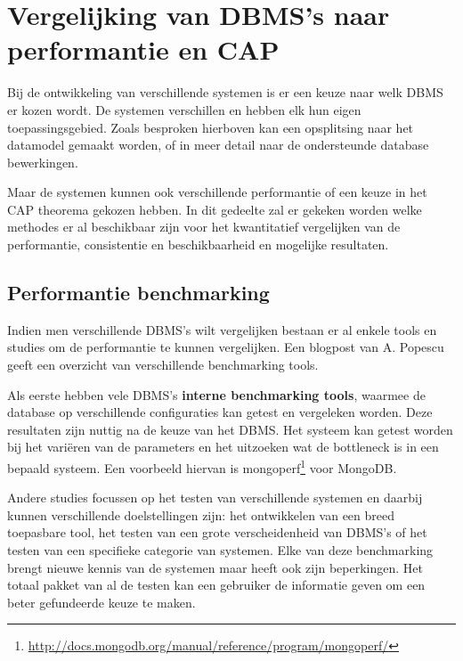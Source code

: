 \section{Vergelijking van DBMS's naar performantie en CAP}
Bij de ontwikkeling van verschillende systemen is er een keuze naar welk DBMS er kozen wordt. De systemen verschillen en hebben elk hun eigen toepassingsgebied. Zoals besproken hierboven kan een opsplitsing naar het datamodel gemaakt worden, of in meer detail naar de ondersteunde database bewerkingen. 

Maar de systemen kunnen ook verschillende performantie of een keuze in het CAP theorema gekozen hebben.  In dit gedeelte zal er gekeken worden welke methodes er al beschikbaar zijn voor het kwantitatief vergelijken van de performantie, consistentie en beschikbaarheid en mogelijke resultaten. 

\subsection{Performantie benchmarking}
Indien men verschillende DBMS's wilt vergelijken bestaan er al enkele tools en studies om de performantie te kunnen vergelijken. Een blogpost van A. Popescu \cite{PopescuBenchmarkOverview} geeft een overzicht van verschillende benchmarking tools. 

Als eerste hebben vele DBMS's \textbf{interne benchmarking tools}, waarmee de database op verschillende configuraties kan getest en vergeleken worden. Deze resultaten zijn nuttig na de keuze van het DBMS. Het systeem kan getest worden bij het variëren van de parameters en het uitzoeken wat de bottleneck is in een bepaald systeem. Een voorbeeld hiervan is mongoperf\footnote{\url{http://docs.mongodb.org/manual/reference/program/mongoperf/}} voor MongoDB. 

Andere studies focussen op het testen van verschillende systemen en daarbij kunnen verschillende doelstellingen zijn: het ontwikkelen van een breed toepasbare tool, het testen van een grote verscheidenheid van DBMS's of het testen van een specifieke categorie van systemen. Elke van deze benchmarking brengt nieuwe kennis van de systemen maar heeft ook zijn beperkingen. Het totaal pakket van al de testen kan een gebruiker de informatie geven om een beter gefundeerde keuze te maken. 

